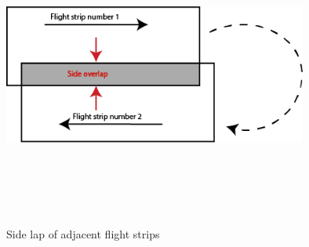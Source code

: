 \begin{figure}[H]
\centering
\includegraphics[width=10cm,height=10cm,keepaspectratio]{imagenes/Side_overlap.png}
\caption{Side lap of adjacent flight strips}
\label{fig:SideLap}
\end{figure}

